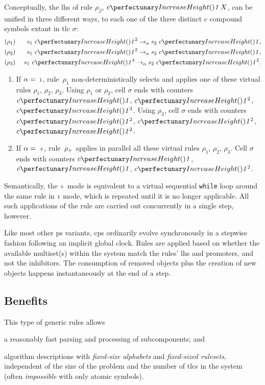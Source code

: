 Conceptually, the \gls{lhs} of rule \(\rho_\beta\), \(\cpfunc{c}{\cpundig \, X}\), can be unified in three different ways,
to each one of the three distinct \(c\) compound symbols extant in \gls{tlc} \(\sigma\):
\begin{eqnarray*}
& (\rho_1)  & ~s_1 ~\cpfunc{c}{\cpundig^2} \rightarrow_{\alpha} s_2 ~\cpfunc{c}{\cpundig},\\
& (\rho_2)  & ~s_1 ~\cpfunc{c}{\cpundig^2} \rightarrow_{\alpha} s_2 ~\cpfunc{c}{\cpundig},\\
& (\rho_3) & ~s_1 ~\cpfunc{c}{\cpundig^3} \rightarrow_{\alpha} s_2 ~\cpfunc{c}{\cpundig^2}.
\end{eqnarray*}

\begin{enumerate}
\item If \(\alpha = \: {\scriptstyle 1}\), rule~\(\rho_1\) 
non-deterministically selects and applies one of these virtual rules \(\rho_1\), \(\rho_2\), \(\rho_3\).
Using \(\rho_1\) or \(\rho_2\), 
cell \(\sigma\) ends with counters \(\cpfunc{c}{\cpundig}\), \(\cpfunc{c}{\cpundig^2}\), \(\cpfunc{c}{\cpundig^3}\).
Using \(\rho_3\),
cell \(\sigma\) ends with counters \(\cpfunc{c}{\cpundig^2}\), \(\cpfunc{c}{\cpundig^2}\), \(\cpfunc{c}{\cpundig^2}\).

\smallskip
\item If \(\alpha = \: {\scriptstyle +}\), rule~\(\rho_{\scriptstyle +}\) 
applies in parallel all these virtual rules \(\rho_1\), \(\rho_2\), \(\rho_3\).
Cell \(\sigma\) ends with counters \(\cpfunc{c}{\cpundig}\), \(\cpfunc{c}{\cpundig}\), \(\cpfunc{c}{\cpundig^2}\).
\end{enumerate}

Semantically, the \({\scriptstyle +}\) mode is equivalent to a virtual sequential \texttt{while} loop around the same rule in \({\scriptstyle 1}\) mode, which is repeated until it is no longer applicable.  All such applications of the rule are carried out concurrently in a single step, however.

Like most other \gls{ps} variants, \gls{cps} ordinarily evolve synchronously in a stepwise fashion following an implicit global clock.  Rules are applied based on whether the available multiset(s) within the system match the rules' \gls{lhs} and \glspl{promoter}, and not the \glspl{inhibitor}.  The consumption of removed objects plus the creation of new objects happens instantaneously at the end of a step.

\subsection{Benefits}
This type of generic rules allows
\begin{inparaenum}[(i)]
\item a reasonably fast parsing and processing of subcomponents; and
\item algorithm descriptions with \emph{fixed-size alphabets} and \emph{fixed-sized \glspl{ruleset}}, 
independent of the size of the problem and the number of \glspl{tlc} in the system (often \emph{impossible} with only atomic symbols).
\end{inparaenum}

